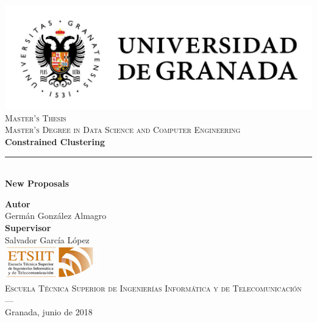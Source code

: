 \begin{titlepage}
 
 
\newlength{\centeroffset}
\setlength{\centeroffset}{-0.5\oddsidemargin}
\addtolength{\centeroffset}{0.5\evensidemargin}
\thispagestyle{empty}

\noindent\hspace*{\centeroffset}\begin{minipage}{\textwidth}

\centering
\includegraphics[width=1\textwidth]{gfx/logougr.jpg}\\[1.4cm]

\textsc{ \Large Master's Thesis\\[0.2cm]}
\textsc{ Master's Degree in Data Science and Computer Engineering}\\[1cm]
% 
{\Huge\bfseries Constrained Clustering\\
}
\noindent\rule[-1ex]{\textwidth}{3pt}\\[3.5ex]
{\large\bfseries New Proposals}
\end{minipage}

\vspace{2.5cm}
\noindent\hspace*{\centeroffset}\begin{minipage}{\textwidth}
\centering

\textbf{Autor}\\ {Germán González Almagro}\\[2.5ex]
\textbf{Supervisor}\\
Salvador García López\\[2cm]
\includegraphics[width=0.3\textwidth]{gfx/etsiitlogo.png}\\[0.1cm]
\textsc{Escuela Técnica Superior de Ingenierías Informática y de Telecomunicación}\\
\textsc{---}\\
Granada, junio de 2018
\end{minipage}
\end{titlepage}


